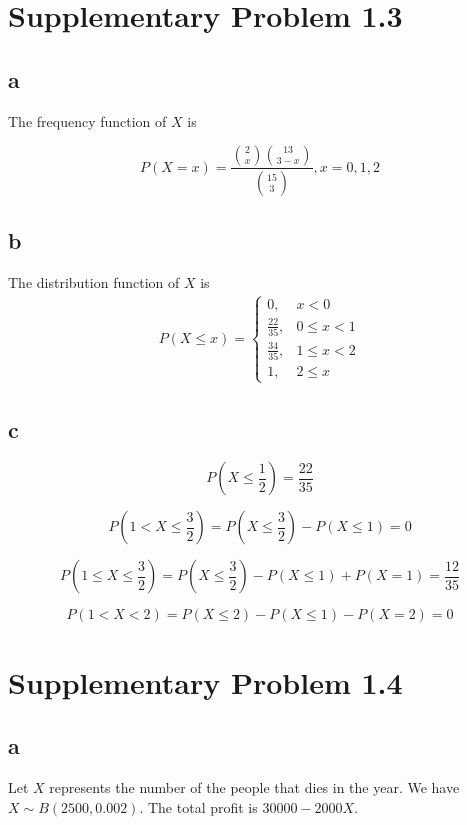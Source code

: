 \documentclass[a4paper, UTF-8]{article}
\theoremstyle{plain}
\begin{document}
\section{Supplementary Problem 1.3}

\subsection{a} 

The frequency function of $X$ is

$$
P(X = x) = \frac{\binom{2}{x}\binom{13}{3-x}}{\binom{15}{3}}, x = 0, 1, 2
$$

\subsection{b} 

The distribution function of $X$ is
\begin{align*}
P(X \leq x) = \begin{cases}
0, & x < 0 \\
\frac{22}{35}, & 0 \leq x < 1 \\
\frac{34}{35}, & 1 \leq x < 2 \\
1, & 2 \leq x 
\end{cases}
\end{align*}

\subsection{c} 

$$
P(X \leq \frac{1}{2}) = \frac{22}{35}
$$

$$
P(1 < X \leq \frac{3}{2}) = P(X \leq \frac{3}{2}) - P(X \leq 1) = 0
$$

$$
P(1 \leq X \leq \frac{3}{2}) = P(X \leq \frac{3}{2}) - P(X \leq 1) + P(X = 1) = \frac{12}{35}
$$

$$
P(1 < X < 2) = P(X \leq 2) - P(X \leq 1) - P(X = 2) = 0
$$

\section{Supplementary Problem 1.4} 

\subsection{a}

Let $X$ represents the number of the people that dies in the year. We have $X \sim B(2500, 0.002)$. The total profit is $30000 - 2000X$.
\end{document}
